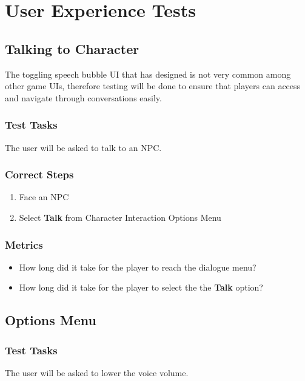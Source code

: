 \section{User Experience Tests}

\subsection{Talking to Character}
The toggling speech bubble UI that \ourteam{} has designed is not very common among other game UIs, therefore  testing will be done to ensure that players can access and navigate through conversations easily.

\subsubsection{Test Tasks}
The user will be asked to talk to an NPC.

\subsubsection{Correct Steps}
\begin{enumerate}
\item{Face an NPC}
\item{Select \textbf{Talk} from Character Interaction Options Menu}
\end{enumerate}

\subsubsection{Metrics}
\begin{itemize}
\item{How long did it take for the player to reach the dialogue menu?}
\item{How long did it take for the player to select the the \textbf{Talk} option?}
\end{itemize}





\subsection{Options Menu}

\subsubsection{Test Tasks}
The user will be asked to lower the voice volume.

